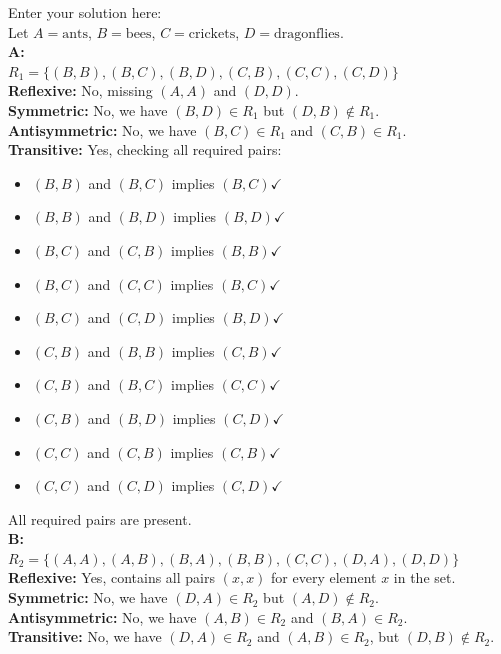 \documentclass[10pt]{exam}
\begin{document}
\begin{questions}
\begin{solution}
    Enter your solution here:\\
    Let $A = \text{ants}$, $B = \text{bees}$, $C = \text{crickets}$, $D = \text{dragonflies}$.\\
    \textbf{A:}\\
    $R_1 = \{(B,B), (B,C), (B,D), (C,B), (C,C), (C,D)\}$\\
    \textbf{Reflexive:} No, missing $(A,A)$ and $(D,D)$.\\
    \textbf{Symmetric:} No, we have $(B,D) \in R_1$ but $(D,B) \notin R_1$.\\
    \textbf{Antisymmetric:} No, we have $(B,C) \in R_1$ and $(C,B) \in R_1$.\\
    \textbf{Transitive:} Yes, checking all required pairs:
    \begin{itemize}
        \item $(B,B)$ and $(B,C)$ implies $(B,C) \checkmark$
        \item $(B,B)$ and $(B,D)$ implies $(B,D) \checkmark$
        \item $(B,C)$ and $(C,B)$ implies $(B,B) \checkmark$
        \item $(B,C)$ and $(C,C)$ implies $(B,C) \checkmark$
        \item $(B,C)$ and $(C,D)$ implies $(B,D) \checkmark$
        \item $(C,B)$ and $(B,B)$ implies $(C,B) \checkmark$
        \item $(C,B)$ and $(B,C)$ implies $(C,C) \checkmark$
        \item $(C,B)$ and $(B,D)$ implies $(C,D) \checkmark$
        \item $(C,C)$ and $(C,B)$ implies $(C,B) \checkmark$
        \item $(C,C)$ and $(C,D)$ implies $(C,D) \checkmark$
    \end{itemize}
    All required pairs are present.\\
    
    \textbf{B:}\\
    $R_2 = \{(A,A), (A,B), (B,A), (B,B), (C,C), (D,A), (D,D)\}$\\
    \textbf{Reflexive:} Yes, contains all pairs $(x,x)$ for every element $x$ in the set.\\
    \textbf{Symmetric:} No, we have $(D,A) \in R_2$ but $(A,D) \notin R_2$.\\
    \textbf{Antisymmetric:} No, we have $(A,B) \in R_2$ and $(B,A) \in R_2$.\\
    \textbf{Transitive:} No, we have $(D,A) \in R_2$ and $(A,B) \in R_2$, but $(D,B) \notin R_2$.\\
    

\end{solution}
\end{questions}
\end{document}
